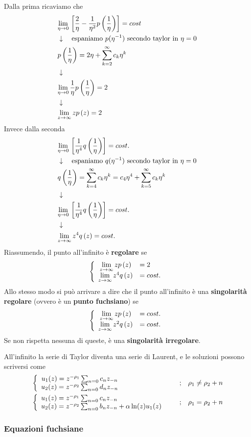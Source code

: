 Dalla prima ricaviamo che
\begin{align}
	&\underset{\eta \rightarrow 0}{\lim} \,\left[\frac{2}{\eta} -\frac{1}{\eta^2}p\left(\frac{1}{\eta}\right)\right] = cost \\ &\downarrow \quad \text{espaniamo $p(\eta^{-1})$ secondo taylor in $\eta = 0$} \nonumber \\
	&p\left(\frac{1}{\eta}\right) = 2\eta + \sum_{k=2}^{\infty} c_k \eta^k \nonumber \\ &\downarrow \nonumber \\
	&\underset{\eta \rightarrow 0}{\lim} \,\frac{1}{\eta}p\left(\frac{1}{\eta}\right) = 2 \nonumber \\ &\downarrow \nonumber \\
	&\underset{z \rightarrow \infty}{\lim} \,zp\left(z\right) = 2	
\end{align}
Invece dalla seconda
\begin{align}
	&\underset{\eta \rightarrow 0}{\lim} \, \left[\frac{1}{\eta^4} q\left(\frac{1}{\eta}\right)\right] = cost.\\ &\downarrow \quad \text{espaniamo $q(\eta^{-1})$ secondo taylor in $\eta = 0$} \nonumber \\
	&q \left(\frac{1}{\eta}\right) = \sum_{k=4}^{\infty} c_k \eta^k = c_4 \eta^4 +  \sum_{k=5}^{\infty} c_k \eta^k \nonumber \\ &\downarrow \nonumber \\
	&\underset{\eta \rightarrow 0}{\lim} \, \left[\frac{1}{\eta^4} q\left(\frac{1}{\eta}\right)\right] = cost. \nonumber \\ &\downarrow \nonumber \\
	&\underset{z \rightarrow \infty}{\lim} \, z^4 q\left(z\right) = cost.
\end{align}
Riassumendo, il punto all'infinito è \textbf{regolare} se
\begin{align}
	\double{\limit{z}{\infty}zp\left(z\right) &= 2\hfill}{\limit{z}{\infty} z^4 q\left(z\right) &= cost.}
\end{align}
Allo stesso modo si può arrivare a dire che il punto all'infinito è una \textbf{singolarità regolare} (ovvero è un \textbf{punto fuchsiano}) se
\begin{align}
	\double{\limit{z}{\infty}zp\left(z\right) &= cost. \hfill}{\limit{z}{\infty} z^2 q\left(z\right) &= cost.}
\end{align}
Se non rispetta nessuna di queste, è una \textbf{singolarità irregolare}.

All'infinito la serie di Taylor diventa una serie di Laurent, e le soluzioni possono scriversi come
\begin{align}
	&\double{u_1(z) = z^{-\rho_1} \sum_{n=0} c_n z_{-n}}{u_2(z) = z^{-\rho_2} \sum_{n=0} d_n z_{-n}} &\spacer &\rho_1 \neq \rho_2 + n\\
	&\double{u_1(z) = z^{-\rho_1} \sum_{n=0} c_n z_{-n}\hfill}{u_2(z) = z^{-\rho_2} \sum_{n=0} b_n z_{-n} + \alpha\ln(z) u_1(z) } &\spacer &\rho_1 = \rho_2 + n
\end{align}

\newpage

\subsubsection{Equazioni fuchsiane}


